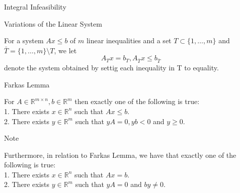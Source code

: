 \documentclass{beamer}
\begin{document}




\begin{frame}{Integral Infeasibility}

	\begin{block}{Variations of the Linear System}

		For a system $Ax \leq b$ of $m$ linear inequalities and a set $T\subset \{1, \dots, m \}$ and $\bar{T} = \{1, \dots, m \} \setminus T$, we let
		\begin{equation}\label{eq:2}
		A_T x = b_T, A_{\bar{T}} x \leq b_{\bar{T}} 
		\end{equation} 
		denote the system obtained by settig each inequality in T to equality. 

	\end{block}

\end{frame}



\begin{frame}  %




	\begin{block}{Farkas Lemma}

		For $A \in \mathbb{R}^{m \times n}, b \in \mathbb{R}^{m}$ then exactly one of the following is true: \\
		1. There exists $x \in \mathbb{R}^n$ such that $Ax \leq b$. \\
		2. There exists $y \in \mathbb{R}^m$ such that $yA=0, yb<0$ and $y \geq 0$. 

	\end{block}

	\begin{block}{Note}

		Furthermore, in relation to Farkas Lemma, we have that exactly one of the following is true: \\
		1. There exists $x \in \mathbb{R}^n$ such that $Ax=b$. \\
		2. There exists $y \in \mathbb{R}^m$ such that $yA=0$ and $by \neq 0$.


	\end{block}

\end{frame}
\end{document}
